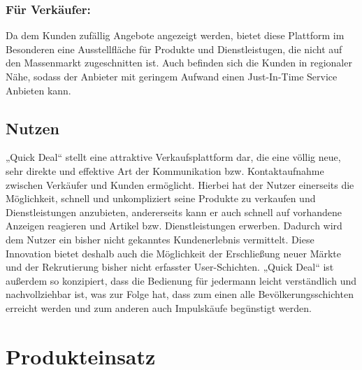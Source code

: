 \documentclass[a4paper,12pt,oneside]{scrartcl}
\begin{document}
\subsubsection*{Für Verkäufer:}
Da dem Kunden zufällig Angebote angezeigt werden, bietet diese Plattform im Besonderen eine Ausstellfläche für Produkte und Dienstleistugen, die nicht auf den Massenmarkt zugeschnitten ist.
Auch befinden sich die Kunden in regionaler Nähe, sodass der Anbieter mit geringem Aufwand einen Just-In-Time Service Anbieten kann.

\subsection{Nutzen}
„Quick Deal“ stellt eine attraktive Verkaufsplattform dar, die eine völlig neue, sehr direkte und effektive Art der Kommunikation bzw. Kontaktaufnahme zwischen Verkäufer und Kunden ermöglicht.
Hierbei hat der Nutzer einerseits die Möglichkeit, schnell und unkompliziert seine Produkte zu verkaufen und Dienstleistungen anzubieten, andererseits kann er auch schnell auf vorhandene Anzeigen reagieren und Artikel bzw. Dienstleistungen erwerben.
Dadurch wird dem Nutzer ein bisher nicht gekanntes Kundenerlebnis vermittelt.
Diese Innovation bietet deshalb auch die Möglichkeit der Erschließung neuer Märkte und der Rekrutierung bisher nicht erfasster User-Schichten.
„Quick Deal“ ist außerdem so konzipiert, dass die Bedienung für jedermann leicht verständlich und nachvollziehbar ist, was zur Folge hat, dass zum einen alle Bevölkerungsschichten erreicht werden und zum anderen auch Impulskäufe begünstigt werden.





\section{Produkteinsatz}
\end{document}
